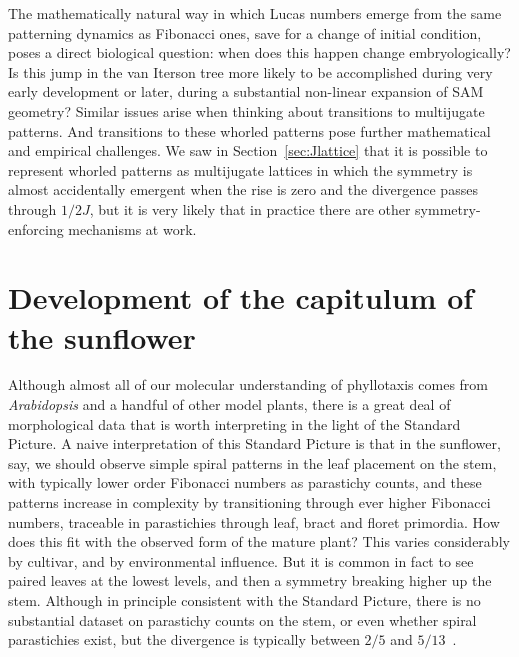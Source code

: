 The mathematically natural way in which Lucas numbers emerge from the same patterning dynamics as Fibonacci ones, save for a change of initial condition, poses a direct biological question: when does this happen change embryologically?  Is this jump in the van Iterson tree more likely to be accomplished during very early development or later, during a substantial non-linear expansion of SAM geometry? Similar issues arise when thinking about transitions to multijugate patterns. And transitions to these whorled patterns pose further mathematical and empirical challenges. We saw in Section~\ref{sec:Jlattice} that it is possible to represent whorled patterns as multijugate lattices in which the symmetry is almost accidentally emergent when the  rise is zero and the divergence passes through $1/2J$, but it is very likely that in practice there are other symmetry-enforcing mechanisms at work. 



\section{Development of the capitulum of the sunflower}
Although almost all of our molecular understanding of phyllotaxis comes from \textit{Arabidopsis} and a handful of other model plants, there is a great deal of morphological data that is worth interpreting in the light of the Standard Picture. 
A naive interpretation of this Standard Picture is that in the sunflower, say, we should observe simple spiral patterns in the leaf placement on the stem, with typically lower order Fibonacci numbers as parastichy counts, and these patterns increase in complexity by transitioning through ever higher Fibonacci numbers, traceable in parastichies through leaf, bract and floret primordia. How does this fit with the observed form of the mature plant? This varies considerably by cultivar, and by environmental influence.
But it is common in fact to see paired leaves at the lowest levels, and then a symmetry breaking higher up the stem. Although in principle consistent with the Standard Picture, there is no substantial dataset on parastichy counts on the stem, or even whether spiral parastichies exist, but the divergence is typically between $2/5$ and $5/13$~\autocite{churchRelationPhyllotaxisMechanical1904}.  

